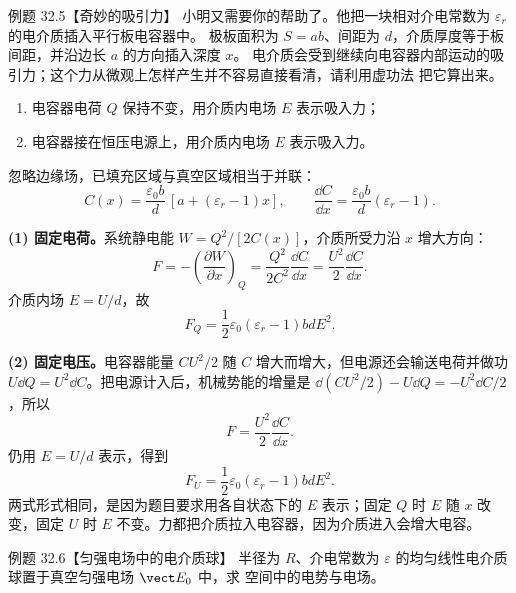 \Needspace{0.42\textheight}
\begin{origexamplebox}{例题 32.5【奇妙的吸引力】}
小明又需要你的帮助了。他把一块相对介电常数为 $\varepsilon_r$ 的电介质插入平行板电容器中。
极板面积为 $S=ab$、间距为 $d$，介质厚度等于板间距，并沿边长 $a$ 的方向插入深度 $x$。
电介质会受到继续向电容器内部运动的吸引力；这个力从微观上怎样产生并不容易直接看清，请利用虚功法
把它算出来。
\begin{enumerate}[label=(\arabic*),leftmargin=2.2em]
  \item 电容器电荷 $Q$ 保持不变，用介质内电场 $E$ 表示吸入力；
  \item 电容器接在恒压电源上，用介质内电场 $E$ 表示吸入力。
\end{enumerate}
\end{origexamplebox}

\begin{xesolution}
忽略边缘场，已填充区域与真空区域相当于并联：
\begin{equation}
  C(x)=\frac{\varepsilon_0b}{d}\,[a+(\varepsilon_r-1)x],
  \qquad
  \frac{\dd C}{\dd x}=\frac{\varepsilon_0b}{d}(\varepsilon_r-1).
\end{equation}

\textbf{(1) 固定电荷。}系统静电能 $W=Q^2/[2C(x)]$，介质所受力沿 $x$ 增大方向：
\[
  F=-\left(\frac{\partial W}{\partial x}\right)_Q
  =\frac{Q^2}{2C^2}\frac{\dd C}{\dd x}
  =\frac{U^2}{2}\frac{\dd C}{\dd x}.
\]
介质内场 $E=U/d$，故
\begin{equation}
  \boxed{F_Q=\frac12\varepsilon_0(\varepsilon_r-1)bdE^2}.
\end{equation}

\textbf{(2) 固定电压。}电容器能量 $CU^2/2$ 随 $C$ 增大而增大，但电源还会输送电荷并做功
$U\dd Q=U^2\dd C$。把电源计入后，机械势能的增量是
$\dd(CU^2/2)-U\dd Q=-U^2\dd C/2$，所以
\[
  F=\frac{U^2}{2}\frac{\dd C}{\dd x}.
\]
仍用 $E=U/d$ 表示，得到
\begin{equation}
  \boxed{F_U=\frac12\varepsilon_0(\varepsilon_r-1)bdE^2}.
\end{equation}
两式形式相同，是因为题目要求用各自状态下的 $E$ 表示；固定 $Q$ 时 $E$ 随 $x$ 改变，固定
$U$ 时 $E$ 不变。力都把介质拉入电容器，因为介质进入会增大电容。

\dielectricPullDiagram
\end{xesolution}

\Needspace{0.4\textheight}
\begin{origexamplebox}{例题 32.6【匀强电场中的电介质球】}
半径为 $R$、介电常数为 $\varepsilon$ 的均匀线性电介质球置于真空匀强电场 $\vect E_0$ 中，求
空间中的电势与电场。
\end{origexamplebox}

